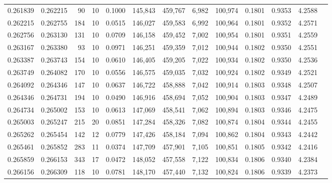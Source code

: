 \begin{tabular}{rrrrrrrrrrrrr}
0.261839 & 0.262215 &    90 &  10 &                                     0.1000 & 145,843 & 459,767 &   6,982 & 100,974 & 0.1801 & 0.9353 & 4.2588 \\
0.262215 & 0.262755 &   184 &  10 &                                     0.0515 & 146,027 & 459,583 &   6,992 & 100,964 & 0.1801 & 0.9352 & 4.2571 \\
0.262756 & 0.263130 &   131 &  10 &                                     0.0709 & 146,158 & 459,452 &   7,002 & 100,954 & 0.1801 & 0.9351 & 4.2559 \\
0.263167 & 0.263380 &    93 &  10 &                                     0.0971 & 146,251 & 459,359 &   7,012 & 100,944 & 0.1802 & 0.9350 & 4.2551 \\
0.263387 & 0.263743 &   154 &  10 &                                     0.0610 & 146,405 & 459,205 &   7,022 & 100,934 & 0.1802 & 0.9350 & 4.2536 \\
0.263749 & 0.264082 &   170 &  10 &                                     0.0556 & 146,575 & 459,035 &   7,032 & 100,924 & 0.1802 & 0.9349 & 4.2521 \\
0.264092 & 0.264346 &   147 &  10 &                                     0.0637 & 146,722 & 458,888 &   7,042 & 100,914 & 0.1803 & 0.9348 & 4.2507 \\
0.264346 & 0.264731 &   194 &  10 &                                     0.0490 & 146,916 & 458,694 &   7,052 & 100,904 & 0.1803 & 0.9347 & 4.2489 \\
0.264734 & 0.265002 &   153 &  10 &                                     0.0613 & 147,069 & 458,541 &   7,062 & 100,894 & 0.1803 & 0.9346 & 4.2475 \\
0.265003 & 0.265247 &   215 &  20 &                                     0.0851 & 147,284 & 458,326 &   7,082 & 100,874 & 0.1804 & 0.9344 & 4.2455 \\
0.265262 & 0.265454 &   142 &  12 &                                     0.0779 & 147,426 & 458,184 &   7,094 & 100,862 & 0.1804 & 0.9343 & 4.2442 \\
0.265461 & 0.265852 &   283 &  11 &                                     0.0374 & 147,709 & 457,901 &   7,105 & 100,851 & 0.1805 & 0.9342 & 4.2416 \\
0.265859 & 0.266153 &   343 &  17 &                                     0.0472 & 148,052 & 457,558 &   7,122 & 100,834 & 0.1806 & 0.9340 & 4.2384 \\
0.266156 & 0.266309 &   118 &  10 &                                     0.0781 & 148,170 & 457,440 &   7,132 & 100,824 & 0.1806 & 0.9339 & 4.2373 \\

\end{tabular}
